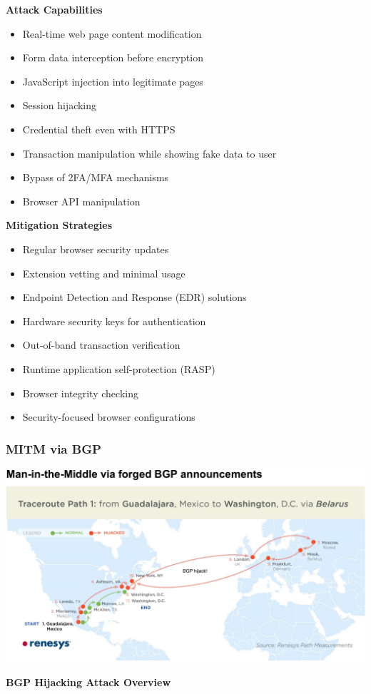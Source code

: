 \textbf{Attack Capabilities}
\begin{itemize}
    \item Real-time web page content modification
    \item Form data interception before encryption
    \item JavaScript injection into legitimate pages
    \item Session hijacking
    \item Credential theft even with HTTPS
    \item Transaction manipulation while showing fake data to user
    \item Bypass of 2FA/MFA mechanisms
    \item Browser API manipulation
\end{itemize}

\textbf{Mitigation Strategies}
\begin{itemize}
    \item Regular browser security updates
    \item Extension vetting and minimal usage
    \item Endpoint Detection and Response (EDR) solutions
    \item Hardware security keys for authentication
    \item Out-of-band transaction verification
    \item Runtime application self-protection (RASP)
    \item Browser integrity checking
    \item Security-focused browser configurations
\end{itemize}

\subsubsection{MITM via BGP}
\begin{center}
\includegraphics[width=\textwidth]{resources/07-mitm-via-bgp.png}
\end{center}
\textbf{BGP Hijacking Attack Overview}

